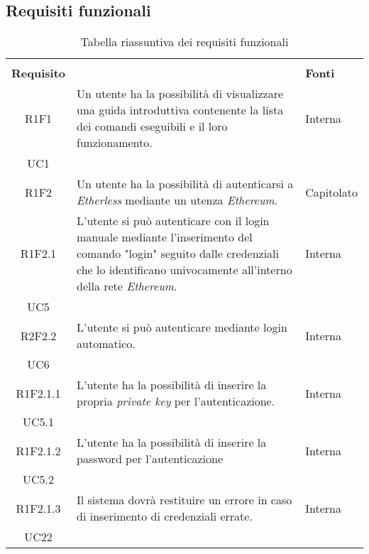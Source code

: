 \subsection{Requisiti funzionali}

\renewcommand{\arraystretch}{2.2}

\begin{longtable}{|c|p{8cm}|C{2cm}|}

	\caption{Tabella riassuntiva dei requisiti funzionali}\\


	\textbf{Requisito} &  & \textbf{Fonti}\\

	\endfirsthead

	R1F1 & Un utente ha la possibilità di visualizzare una guida introduttiva contenente la lista dei comandi eseguibili e il loro funzionamento. &  \centering Interna \\ UC1 \tabularnewline

	R1F2 & Un utente ha la possibilità di autenticarsi a \textit{Etherless} mediante un utenza \textit{Ethereum\glos}. & Capitolato \\

	R1F2.1 & L'utente si può autenticare con il login manuale mediante l'inserimento del comando "login" seguito dalle credenziali che lo identificano univocamente all'interno della rete \textit{Ethereum\glos}.  & \centering Interna \\ UC5 \tabularnewline

	R2F2.2 & L'utente si può autenticare mediante login automatico. & \centering Interna \\ UC6 \tabularnewline


	R1F2.1.1 &  L'utente ha la possibilità di inserire la propria \textit{private key\glo} per l'autenticazione. & \centering Interna \\ UC5.1 \tabularnewline
	
	R1F2.1.2 & L'utente ha la possibilità di inserire la password per l'autenticazione & \centering Interna \\ UC5.2 \tabularnewline

	R1F2.1.3 &  Il sistema dovrà restituire un errore in caso di inserimento di credenziali errate. & \centering Interna \\ UC22 \tabularnewline


\end{longtable}
